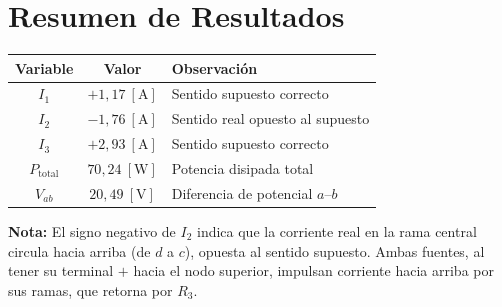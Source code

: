 \documentclass[12pt,letterpaper]{article}
\begin{document}
\section*{Resumen de Resultados}

\begin{center}
\begin{tabular}{|c|c|l|}
\hline
\textbf{Variable} & \textbf{Valor} & \textbf{Observaci\'on} \\
\hline
$I_1$ & $+1{,}17\ [\text{A}]$ & Sentido supuesto correcto \\
$I_2$ & $-1{,}76\ [\text{A}]$ & Sentido real opuesto al supuesto \\
$I_3$ & $+2{,}93\ [\text{A}]$ & Sentido supuesto correcto \\
$P_{\text{total}}$ & $70{,}24\ [\text{W}]$ & Potencia disipada total \\
$V_{ab}$ & $20{,}49\ [\text{V}]$ & Diferencia de potencial $a$--$b$ \\
\hline
\end{tabular}
\end{center}

\medskip
\noindent\textbf{Nota:} El signo negativo de $I_2$ indica que la corriente real en la rama
central circula hacia arriba (de $d$ a $c$), opuesta al sentido supuesto. Ambas fuentes,
al tener su terminal $+$ hacia el nodo superior, impulsan corriente hacia arriba por sus
ramas, que retorna por $R_3$.
\end{document}
